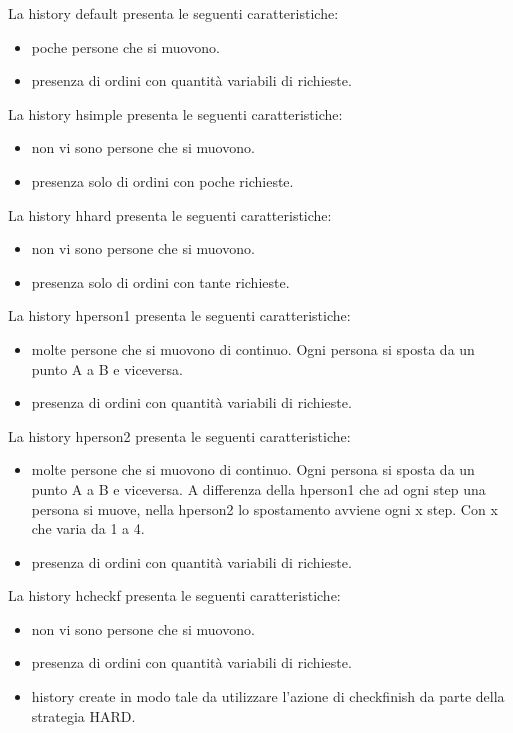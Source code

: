 La history default presenta le seguenti caratteristiche:
\begin{itemize}
  \item poche persone che si muovono.
  \item presenza di ordini con quantità variabili di richieste.
\end{itemize}
La history hsimple presenta le seguenti caratteristiche:
\begin{itemize}
    \item non vi sono persone che si muovono.
    \item presenza solo di ordini con poche richieste.
  \end{itemize}
La history hhard presenta le seguenti caratteristiche:
\begin{itemize}
    \item non vi sono persone che si muovono.
    \item presenza solo di ordini con tante richieste.
  \end{itemize}
La history hperson1 presenta le seguenti caratteristiche:
\begin{itemize}
    \item molte persone che si muovono di continuo. Ogni persona si sposta da un punto A a B e viceversa.
    \item presenza di ordini con quantità variabili di richieste.  
\end{itemize}
La history hperson2 presenta le seguenti caratteristiche:
\begin{itemize}
    \item molte persone che si muovono di continuo. Ogni persona si sposta da un punto A a B e viceversa. A differenza della hperson1 che ad ogni step una persona si muove, nella hperson2 lo spostamento avviene ogni x step. Con x che varia da 1 a 4.
    \item presenza di ordini con quantità variabili di richieste.
\end{itemize}
La history hcheckf presenta le seguenti caratteristiche:
\begin{itemize}
    \item non vi sono persone che si muovono.
    \item presenza di ordini con quantità variabili di richieste.
    \item history create in modo tale da utilizzare l'azione di checkfinish da parte della strategia HARD.
\end{itemize}


